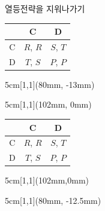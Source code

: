 \documentclass[final]{beamer}
\begin{document}
\begin{frame}[t]{열등전략을 지워나가기}
	\begin{center}
	\begin{table}
	\setlength{\tabcolsep}{1.2em}
	\begin{tabular}{|c|c|c|} \hline
	& {C} &  {D}\\ \hline
	{C} & {$R$}, {$R$} & {$S$}, {$T$} \\ \hline%
	{D} & {$T$}, {$S$}  & {$P$}, {$P$} \\ 
	\hline
	\end{tabular}
	\end{table}
	\end{center}

	\pause
	\begin{textblock*}{5cm}[1,1](80mm, -13mm)%
	\end{textblock*}

	\pause
	\begin{textblock*}{5cm}[1,1](102mm, 0mm)%
	\end{textblock*}

	\vspace{2em}

	\begin{center}
	\begin{table}
	\setlength{\tabcolsep}{1.2em}
	\begin{tabular}{|c|c|c|} \hline
	& {C} &  {D}\\ \hline
	{C} & {$R$}, {$R$} & {$S$}, {$T$} \\ \hline%
	{D} & {$T$}, {$S$}  & {$P$}, {$P$} \\ 
	\hline
	\end{tabular}
	\end{table}
	\end{center}

	\pause
	\begin{textblock*}{5cm}[1,1](102mm,0mm)%
	\end{textblock*}

	\pause
	\begin{textblock*}{5cm}[1,1](80mm, -12.5mm)%
	\end{textblock*}
\end{frame}
\end{document}
